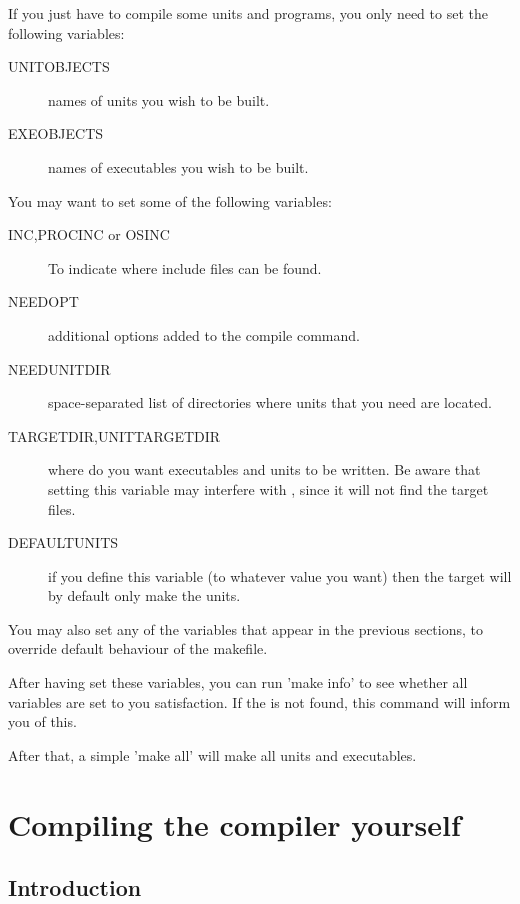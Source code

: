\documentclass{report}
\begin{document}
If you just have to compile some units and programs, you only need to set
the following variables:
\begin{description}
\item[UNITOBJECTS] names of units you wish to be built.
\item[EXEOBJECTS] names of executables you wish to be built.
\end{description}

You may want to set some of the following variables:
\begin{description}
\item[INC,PROCINC or OSINC] To indicate where include files can be found.
\item[NEEDOPT] additional options added to the compile command.
\item[NEEDUNITDIR] space-separated list of directories where units that you
need are located.
\item[TARGETDIR,UNITTARGETDIR] where do you want executables and units to
be written. Be aware that setting this variable may interfere with
, since it will not find the target files.
\item[DEFAULTUNITS] if you define this variable (to whatever value you want)
then the  target will by default only make the units.
\end{description}

You may also set any of the variables that appear in the previous sections,
to override default behaviour of the makefile.

After having set these variables, you can run 'make info' to see whether all
variables are set to you satisfaction. If the  is not
found, this command will inform you of this.

After that, a simple 'make all' will make all units and executables.


\chapter{Compiling the compiler yourself}
\label{ch:AppF}

\section{Introduction}
\end{document}
